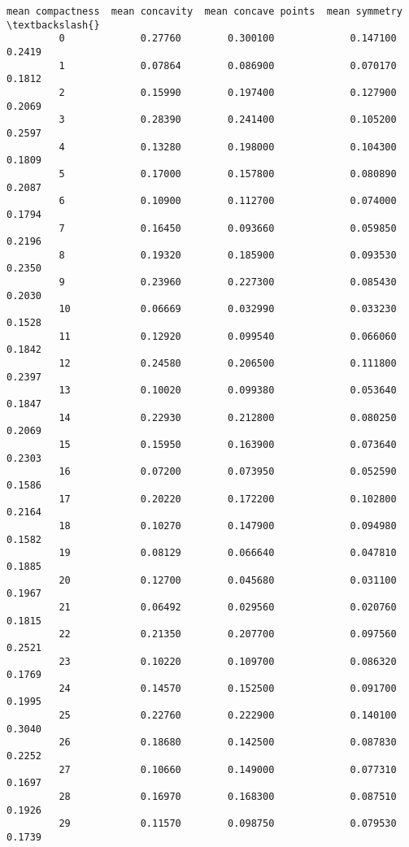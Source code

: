 \documentclass[11pt]{article}
\begin{document}
\begin{Verbatim}[commandchars=\\\{\}]
              mean compactness  mean concavity  mean concave points  mean symmetry  \textbackslash{}
         0             0.27760        0.300100             0.147100         0.2419   
         1             0.07864        0.086900             0.070170         0.1812   
         2             0.15990        0.197400             0.127900         0.2069   
         3             0.28390        0.241400             0.105200         0.2597   
         4             0.13280        0.198000             0.104300         0.1809   
         5             0.17000        0.157800             0.080890         0.2087   
         6             0.10900        0.112700             0.074000         0.1794   
         7             0.16450        0.093660             0.059850         0.2196   
         8             0.19320        0.185900             0.093530         0.2350   
         9             0.23960        0.227300             0.085430         0.2030   
         10            0.06669        0.032990             0.033230         0.1528   
         11            0.12920        0.099540             0.066060         0.1842   
         12            0.24580        0.206500             0.111800         0.2397   
         13            0.10020        0.099380             0.053640         0.1847   
         14            0.22930        0.212800             0.080250         0.2069   
         15            0.15950        0.163900             0.073640         0.2303   
         16            0.07200        0.073950             0.052590         0.1586   
         17            0.20220        0.172200             0.102800         0.2164   
         18            0.10270        0.147900             0.094980         0.1582   
         19            0.08129        0.066640             0.047810         0.1885   
         20            0.12700        0.045680             0.031100         0.1967   
         21            0.06492        0.029560             0.020760         0.1815   
         22            0.21350        0.207700             0.097560         0.2521   
         23            0.10220        0.109700             0.086320         0.1769   
         24            0.14570        0.152500             0.091700         0.1995   
         25            0.22760        0.222900             0.140100         0.3040   
         26            0.18680        0.142500             0.087830         0.2252   
         27            0.10660        0.149000             0.077310         0.1697   
         28            0.16970        0.168300             0.087510         0.1926   
         29            0.11570        0.098750             0.079530         0.1739   

\end{Verbatim}
\end{document}

